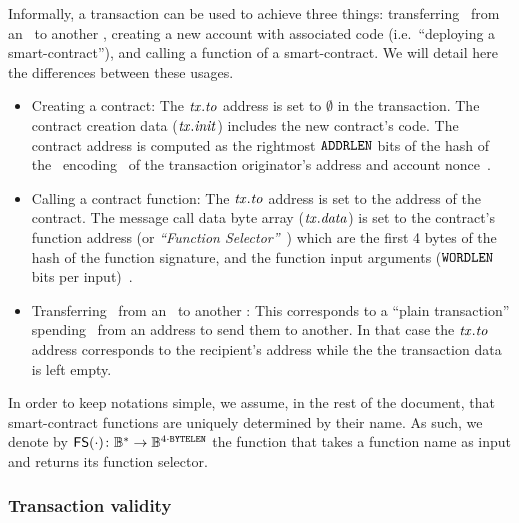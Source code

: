 Informally, a transaction can be used to achieve three things: transferring \wei~from an \eoa~to another \eoa, creating a new account with associated code (i.e.~``deploying a smart-contract''), and calling a function of a smart-contract. We will detail here the differences between these usages.
\begin{itemize}
    \item Creating a contract: The $\mathit{tx}.\mathit{to}$ address is set to $\emptyset$ in the transaction. The contract creation data ($\mathit{tx}.\mathit{init}$) includes the new contract's code. The contract address is computed as the rightmost $\mathtt{ADDRLEN}$ bits of the  hash of the \rlp~encoding~\cite{ethrlp} of the transaction originator's address and account nonce~\cite[Section 6]{ethyellowpaper}.
    \item Calling a contract function: The $\mathit{tx}.\mathit{to}$ address is set to the address of the contract. The message call data byte array ($\mathit{tx}.\mathit{data}$) is set to the contract's function address (or \emph{``Function Selector''}~\cite{abi-function-selector}) which are the first 4 bytes of the  hash of the function signature, and the function input arguments ($\mathtt{WORDLEN}$ bits per input)~\cite[Section 8]{ethyellowpaper}.
    \item Transferring \wei~from an \eoa~to another \eoa: This corresponds to a ``plain transaction'' spending \wei~from an address to send them to another. In that case the $\mathit{tx}.\mathit{to}$ address corresponds to the recipient's address while the the transaction data is left empty.
\end{itemize}

\begin{notebox}
    In order to keep notations simple, we assume, in the rest of the document, that smart-contract functions are uniquely determined by their name. As such, we denote by $\mathsf{FS({\cdot})} \colon \mathbb{B}^{*} \to \mathbb{B}^{4 \cdot \mathtt{BYTELEN}}$ the function that takes a function name as input and returns its function selector.
\end{notebox}

\subsubsection{Transaction validity}\label{preliminaries:ethereum:eth-tx:tx-validity}

